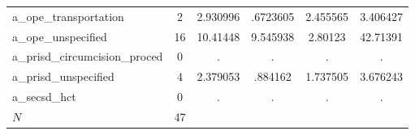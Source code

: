 \begin{table}[htbp]
\begin{tabular}{l*{1}{ccccc}}
a\_ope\_transportation&           2&    2.930996&    .6723605&    2.455565&    3.406427\\
a\_ope\_unspecified&          16&    10.41448&    9.545938&     2.80123&    42.71391\\
a\_prisd\_circumcision\_proced&           0&           .&           .&           .&           .\\
a\_prisd\_unspecified&           4&    2.379053&     .884162&    1.737505&    3.676243\\
a\_secsd\_hct &           0&           .&           .&           .&           .\\
\hline
\(N\)       &          47&            &            &            &            \\
\hline\hline
\end{tabular}
\end{table}
